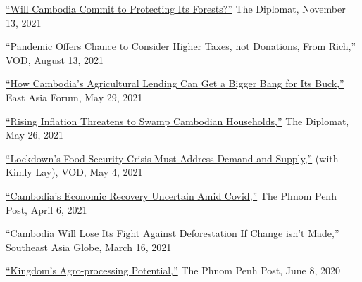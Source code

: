 \documentclass[10pt,a4paper]{article}
\begin{document}
	\href{https://thediplomat.com/2021/11/will-cambodia-commit-to-protecting-its-forests/}{``Will Cambodia Commit to Protecting Its Forests?''} The Diplomat, November 13, 2021\\ \vspace{-.5em}

	\href{https://vodenglish.news/opinion-pandemic-offers-chance-to-consider-higher-taxes-not-donations-from-rich/}{``Pandemic Offers Chance to Consider Higher Taxes, not Donations, From Rich,''} VOD, August 13, 2021\\ \vspace{-.5em}

	\href{https://www.eastasiaforum.org/2021/05/29/how-cambodias-agricultural-lending-can-get-a-bigger-bang-for-its-buck/}{``How Cambodia's Agricultural Lending Can Get a Bigger Bang for Its Buck,''} East Asia Forum, May 29, 2021\\ \vspace{-.5em}

	\href{https://thediplomat.com/2021/05/rising-inflation-threatens-to-swamp-cambodian-households/}{``Rising Inflation Threatens to Swamp Cambodian Households,''} The Diplomat, May 26, 2021\\ \vspace{-.5em}

	\href{https://vodenglish.news/opinion-lockdowns-food-security-crisis-must-address-demand-and-supply/}{``Lockdown's Food Security Crisis Must Address Demand and Supply,''} (with Kimly Lay), VOD, May 4, 2021\\ \vspace{-.5em}

	\href{https://www.phnompenhpost.com/opinion/cambodias-economic-recovery-uncertain-amid-covid}{``Cambodia's Economic Recovery Uncertain Amid Covid,''} The Phnom Penh Post, April 6, 2021\\ \vspace{-.5em}

	\href{https://southeastasiaglobe.com/cambodia-deforestation-fight/}{``Cambodia Will Lose Its Fight Against Deforestation If Change isn't Made,''} Southeast Asia Globe, March 16, 2021\\ \vspace{-.5em}

	\href{https://www.phnompenhpost.com/opinion/kingdoms-agro-processing-potential}{``Kingdom’s Agro-processing Potential,''} The Phnom Penh Post, June 8, 2020\\  \vspace{-.5em}
\end{document}
